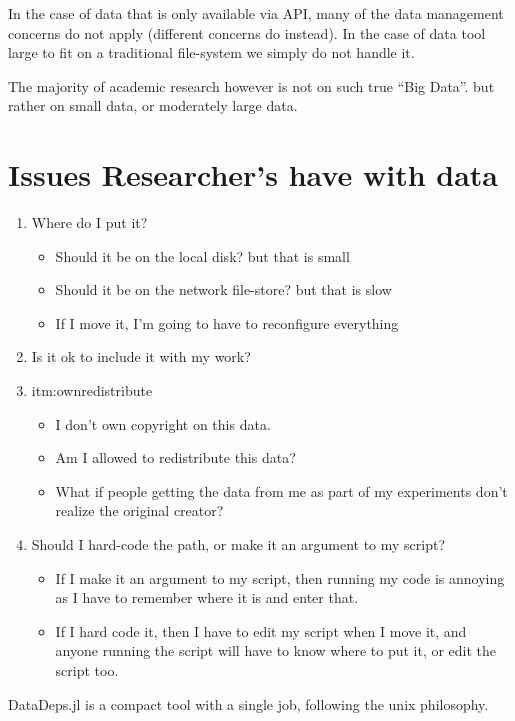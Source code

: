 \documentclass[]{article}
\begin{document}
In the case of data that is only available via API, many of the data management concerns do not apply (different concerns do instead).
In the case of data tool large to fit on a traditional file-system we simply do not handle it.

The majority of academic research however is not on such true ``Big Data''.
but rather on small data, or moderately large data.


\section{Issues Researcher's have with data}
\begin{enumerate}
	\item Where do I put it? \label{itm:where}
	\begin{itemize}
		\item Should it be on the local disk? but that is small
		\item Should it be on the network file-store? but that is slow
		\item If I move it, I'm going to have to reconfigure everything
	\end{itemize}
	\item Is it ok to include it with my work? \item{itm:ownredistribute}
	\begin{itemize}
		\item I don't own copyright on this data.
		\item Am I allowed to redistribute this data?
		\item What if people getting the data from me as part of my experiments don't realize the original creator?
	\end{itemize}
	\item Should I hard-code the path, or make it an argument to my script? \label{itm:path}
	\begin{itemize}
		\item If I make it an argument to my script, then running my code is annoying as I have to remember where it is and enter that.
		\item If I hard code it, then I have to edit my script when I move it, and anyone running the script will have to know where to put it, or edit the script too.
	\end{itemize}
\end{enumerate}





DataDeps.jl is a compact tool with a single job, following the unix philosophy.
\end{document}
